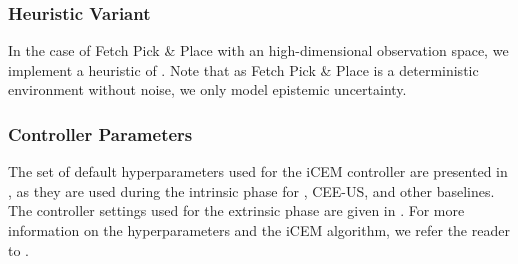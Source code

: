 \subsubsection{\opacex Heuristic Variant}
In the case of Fetch Pick \& Place with an high-dimensional observation space, we implement a heuristic of \opacex. Note that as Fetch Pick \& Place is a deterministic environment without noise, we only model epistemic uncertainty. 

\begin{algorithm}[H]
    \caption*{\textbf{\opacex (Heuristic Variant)}}
    \label{algorithm:heuristicOpAcEx}
    \begin{algorithmic}[]
        \ENDFOR
    \end{algorithmic}
\end{algorithm}

\subsubsection{Controller Parameters}
The set of default hyperparameters used for the iCEM controller are presented in , as they are used during the intrinsic phase for \opacex, CEE-US, and other baselines.
The controller settings used for the extrinsic phase are given in . For more information on the hyperparameters and the iCEM algorithm, we refer the reader to \cite{iCem}.

